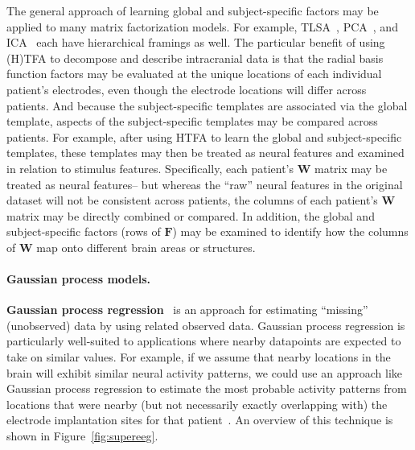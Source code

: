 \documentclass{llmxive}
\begin{document}
The general approach of learning global and subject-specific factors
may be applied to many matrix factorization models.  For example,
TLSA~\citep{GersEtal11}, PCA~\citep{WestEtal98}, and
ICA~\citep{WangGuo19} each have hierarchical framings as well.  The
particular benefit of using (H)TFA to decompose and describe
intracranial data is that the radial basis function factors may be
evaluated at the unique locations of each individual patient's
electrodes, even though the electrode locations will differ across
patients.  And because the subject-specific templates are associated
via the global template, aspects of the subject-specific templates may
be compared across patients.  For example, after using HTFA to learn
the global and subject-specific templates, these templates may then be
treated as neural features and examined in relation to stimulus
features.  Specifically, each patient's $\mathbf{W}$ matrix may be
treated as neural features-- but whereas the ``raw'' neural features
in the original dataset will not be consistent across patients, the
columns of each patient's $\mathbf{W}$ matrix may be directly combined
or compared.  In addition, the global and subject-specific factors
(rows of $\mathbf{F}$) may be examined to identify how the columns of
$\mathbf{W}$ map onto different brain areas or structures.


\paragraph{Gaussian process models.}  \textbf{Gaussian process
  regression}~\citep{Rasm06} is an approach for estimating ``missing''
(unobserved) data by using related observed data.  Gaussian process
regression is particularly well-suited to applications where nearby
datapoints are expected to take on similar values.  For example, if we
assume that nearby locations in the brain will exhibit similar neural
activity patterns, we could use an approach like Gaussian process
regression to estimate the most probable activity patterns from
locations that were nearby (but not necessarily exactly overlapping
with) the electrode implantation sites for that
patient~\citep{OwenEtal20}.  An overview of this technique is shown in
Figure~\ref{fig:supereeg}.
\end{document}
